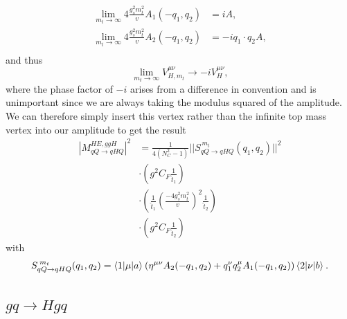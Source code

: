 \begin{equation}
\begin{split}
\lim_{m_t \to \infty} 4 \frac{g_s^2 m_t^2}{v}A_1(-q_1,q_2) &= i A, \\
\lim_{m_t \to \infty} 4 \frac{g_s^2 m_t^2}{v}A_2(-q_1,q_2) &= -i q_1 \cdot q_2 A, \\
\end{split}
\end{equation}
and thus
\begin{equation}
\lim_{m_t \to \infty}V^{\mu \nu}_{H, m_t} \to -i V^{\mu \nu}_H,
\end{equation}
where the phase factor of $-i$ arises from a difference in convention and is unimportant since we are always taking the modulus squared of the amplitude. We can therefore simply insert this vertex rather than the infinite top mass vertex into our amplitude to get the result
\begin{equation}
\begin{split}
|M_{qQ \to qHQ}^{HE,ggH}|^2 &= \frac{1}{4(N_C^2 - 1)} ||S_{qQ \to qHQ}^{\hspace{2pt} m_t}(q_1, q_2)||^2 \\
& \cdot \left(g^2 C_F \frac{1}{\hat{t}_1} \right) \\
& \cdot \left(\frac{1}{\hat{t}_1} \left(\frac{-4 g_s^2 m_t^2}{v} \right)^2 \frac{1}{\hat{t}_2} \right) \\
& \cdot \left(g^2 C_F \frac{1}{\hat{t}_2} \right)
\end{split}
\end{equation}
with
\begin{equation}
S_{qQ \to qHQ}^{\hspace{2pt} m_t}(q_1, q_2) = \mathinner{\langle1\vert\mu\vert a\rangle}_{} (\eta^{\mu \nu}A_2(-q_1,q_2) + q_1^\nu q_2^\mu A_1(-q_1,q_2))\mathinner{\langle2\vert\nu\vert b\rangle}_{}. 
\end{equation} 

\subsection{$gq \to Hgq$}

